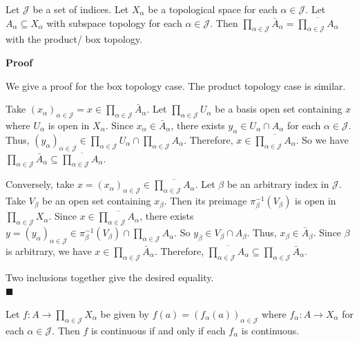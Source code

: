 \documentclass[main.tex]{subfiles}
\begin{document}
\begin{theorem}
    Let $\mathcal{J}$ be a set of indices. Let $X_{\alpha}$ be a topological space for each $\alpha \in \mathcal{J}$. Let $A_{\alpha} \subseteq X_{\alpha}$ with subspace topology for each $\alpha \in \mathcal{J}$. Then $\prod_{\alpha \in \mathcal{J}} \bar{A}_{\alpha} = \overline{\prod_{\alpha \in \mathcal{J}} A_{\alpha}}$ with the product/ box topology.
\end{theorem}

\par \noindent \textbf{Proof}
\par We give a proof for the box topology case. The product topology case is similar. 
\par Take $(x_{\alpha})_{\alpha \in \mathcal{J}} = x \in \prod_{\alpha \in \mathcal{J}} \bar{A}_{\alpha}$. Let $\prod_{\alpha \in \mathcal{J}} U_{\alpha}$ be a basis open set containing $x$ where $U_{\alpha}$ is open in $X_{\alpha}$. Since $x_{\alpha} \in \bar{A}_{\alpha}$, there exists $y_{\alpha} \in U_{\alpha} \cap A_{\alpha}$ for each $\alpha \in \mathcal{J}$. Thus, $(y_{\alpha})_{\alpha \in \mathcal{J}} \in \prod_{\alpha \in \mathcal{J}} U_{\alpha} \cap \prod_{\alpha \in \mathcal{J}} A_{\alpha}$. Therefore, $x \in \overline{\prod_{\alpha \in \mathcal{J}} A_{\alpha}}$. So we have $\prod_{\alpha \in \mathcal{J}} \bar{A}_{\alpha} \subseteq \overline{\prod_{\alpha \in \mathcal{J}} A_{\alpha}}$. 
\par Conversely, take $x = (x_{\alpha})_{\alpha \in \mathcal{J}} \in \overline{\prod_{\alpha \in \mathcal{J}} A_{\alpha}}$. Let $\beta$ be an arbitrary index in $\mathcal{J}$. Take $V_{\beta}$ be an open set containing $x_{\beta}$. Then its preimage $\pi_{\beta}^{-1}(V_{\beta})$ is open in $\prod_{\alpha \in \mathcal{J}} X_{\alpha}$. Since $x\in \overline{\prod_{\alpha \in \mathcal{J}} A_{\alpha}}$, there exists $y = (y_{\alpha})_{\alpha \in \mathcal{J}} \in \pi_{\beta}^{-1}(V_{\beta}) \cap \prod_{\alpha \in \mathcal{J}} A_{\alpha}$. So $y_{\beta} \in V_{\beta} \cap A_{\beta}$. Thus, $x_{\beta} \in \bar{A}_{\beta}$. Since $\beta$ is arbitrary, we have $x \in \prod_{\alpha \in \mathcal{J}} \bar{A}_{\alpha}$. Therefore, $\overline{\prod_{\alpha \in \mathcal{J}} A_{\alpha}} \subseteq \prod_{\alpha \in \mathcal{J}} \bar{A}_{\alpha}$.

\par Two inclusions together give the desired equality. 
\mbox{} \\ \null \hfill $\blacksquare$ 

\begin{theorem}
    Let $f: A \rightarrow \prod_{\alpha \in \mathcal{J}} X_{\alpha}$ be given by $f(a) = (f_{\alpha}(a))_{\alpha \in \mathcal{J}}$ where $f_{\alpha}: A \rightarrow X_{\alpha}$ for each $\alpha \in \mathcal{J}$. Then $f$ is continuous if and only if each $f_{\alpha}$ is continuous. 
\end{theorem}
\end{document}
